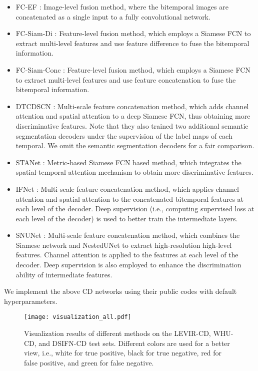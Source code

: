 \documentclass[journal]{IEEEtran}
\begin{document}
\begin{itemize}
    \item FC-EF \cite{Daudt2018}: Image-level fusion method, where the bitemporal images are concatenated as a single input to a fully convolutional network.
    \item FC-Siam-Di \cite{Daudt2018}: Feature-level fusion method, which employs a Siamese FCN to extract multi-level features and use feature difference to fuse the bitemporal information.
    \item FC-Siam-Conc \cite{Daudt2018}: Feature-level fusion method, which employs a Siamese FCN to extract multi-level features and use feature concatenation to fuse the bitemporal information.
    \item DTCDSCN \cite{Liu2019b}: Multi-scale feature concatenation method, which adds channel attention and spatial attention to a deep Siamese FCN, thus obtaining more discriminative features. Note that they also trained two additional semantic segmentation decoders under the supervision of the label maps of each temporal. We omit the semantic segmentation decoders for a fair comparison.
    \item STANet \cite{Chen2020e}: Metric-based Siamese FCN based method, which integrates the spatial-temporal attention mechanism to obtain more discriminative features.
    \item IFNet \cite{Zhang2020b}: Multi-scale feature concatenation method, which applies channel attention and spatial attention to the concatenated bitemporal features at each level of the decoder. Deep supervision (i.e., computing supervised loss at each level of the decoder) is used to better train the intermediate layers.
    \item SNUNet \cite{Fang2021}: Multi-scale feature concatenation method, which combines the Siamese network and NestedUNet\cite{Zhou2018} to extract high-resolution high-level features. Channel attention is applied to the features at each level of the decoder. Deep supervision is also employed to enhance the discrimination ability of intermediate features.
   
\end{itemize}

We implement the above CD networks using their public codes with default hyperparameters. 

\begin{figure*}
    \centering
    \texttt{[image: visualization\_all.pdf]}
    \caption{Visualization results of different methods on the LEVIR-CD, WHU-CD, and DSIFN-CD test sets. Different colors are used for a better view, i.e., white for true positive, black for true negative, red for false positive, and green for false negative.}
    \label{fig:visualization_all}
\end{figure*}
\end{document}
